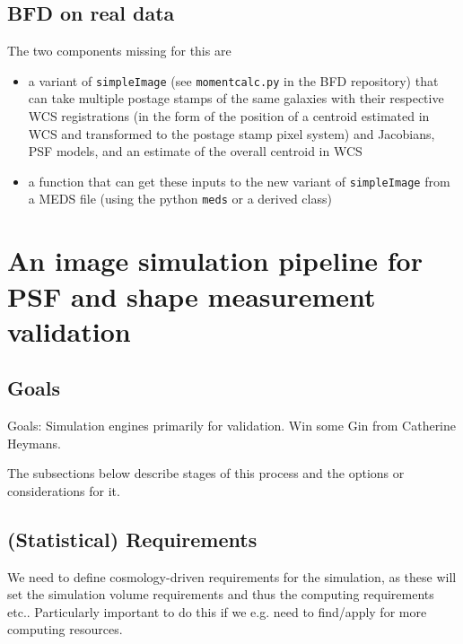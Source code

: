 \documentclass[\docopts]{\docclass}
\begin{document}
\subsection{BFD on real data}


The two components missing for this are
\begin{itemize}
\item a variant of \texttt{simpleImage} (see \texttt{momentcalc.py} in the BFD repository) that can take multiple postage stamps of the same galaxies with their respective WCS registrations (in the form of the position of a centroid estimated in WCS and transformed to the postage stamp pixel system) and Jacobians, PSF models, and an estimate of the overall centroid in WCS 
\item a function that can get these inputs to the new variant of \texttt{simpleImage} from a MEDS file (using the python \texttt{meds} or a derived class) 
\end{itemize}



\section{An image simulation pipeline for PSF and shape measurement validation}


\subsection{Goals}
Goals: Simulation engines primarily for validation. Win some Gin from Catherine Heymans.

The subsections below describe stages of this process and the options or considerations for it.

\subsection{(Statistical) Requirements}

We need to define cosmology-driven requirements for the simulation, as these will set the simulation volume requirements and thus the computing requirements etc.. Particularly important to do this if we e.g. need to find/apply for more computing resources. 
\end{document}
